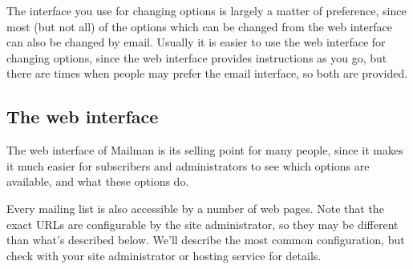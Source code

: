 \documentclass{howto}
\begin{document}
The interface you use for changing options is largely
a matter of preference, since most (but not all) of the options which can 
be changed from the web interface can also be changed by email.
 Usually it is easier to use the web interface for 
changing options, since the web interface provides instructions as you go, but
there are times when people may prefer the email interface, so both are 
provided.

\subsection{The web interface\label{sec:web}}
The web interface of Mailman is its selling point for many people,
since it makes it much easier for subscribers and administrators to see 
which options are available, and what these options do.  

Every mailing list is also accessible by a number of web pages.  Note that
the exact URLs are configurable by the site administrator, so they may be
different than what's described below.  We'll describe the most common
configuration, but check with your site administrator or hosting
service for details.
\end{document}
